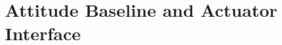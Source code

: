 \documentclass[letterpaper, 10 pt, conference]{ieeeconf}
\begin{document}

\section{Attitude Baseline and Actuator Interface}
\label{sec:problem}
\end{document}
